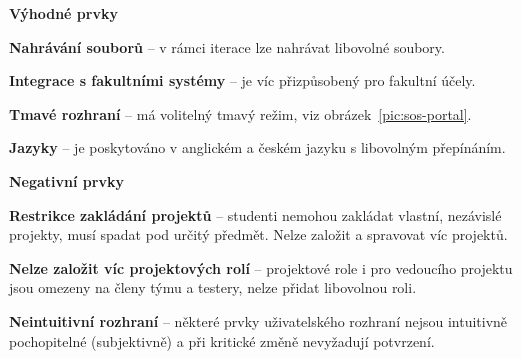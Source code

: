 \textbf{Výhodné prvky}

\begin{ul}
   \item
   \textbf{Nahrávání souborů} – v rámci iterace lze nahrávat libovolné soubory.
   \item
   \textbf{Integrace s fakultními systémy} –  je víc přizpůsobený pro fakultní účely.
   \item
   \textbf{Tmavé rozhraní} –  má volitelný tmavý režim, viz obrázek~\ref{pic:sos-portal}.
   \item
   \textbf{Jazyky} –  je poskytováno v anglickém a českém jazyku s libovolným přepínáním.
\end{ul}


\textbf{Negativní prvky}

\begin{ul}
   \item
   \textbf{Restrikce zakládání projektů} – studenti nemohou zakládat vlastní, nezávislé projekty, musí spadat pod určitý předmět.
   Nelze založit a spravovat víc projektů.
   \item
   \textbf{Nelze založit víc projektových rolí} – projektové role i pro vedoucího projektu jsou omezeny na členy týmu a testery, nelze přidat libovolnou roli.
   \item
   \textbf{Neintuitivní rozhraní} – některé prvky uživatelského rozhraní nejsou intuitivně pochopitelné (subjektivně) a při kritické změně nevyžadují potvrzení.
\end{ul}
